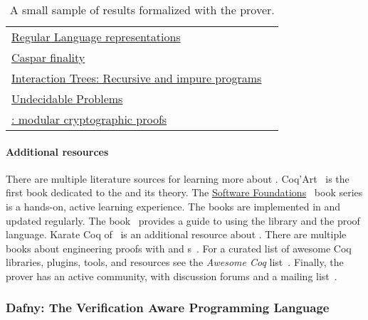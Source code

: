 \begin{table}[p]
\begin{NiceTabularX}{\textwidth}{@{}l@{ }X@{}}
   \href{https://github.com/rocq-community/reglang}%
   {Regular Language representations}
   & \textcite{doczkal2018}
   \\
   \href{https://github.com/runtimeverification/casper-proofs/tree/master}
   {Caspar  finality}
   & \textcite{palmskog2018}
   \\
   \href{https://github.com/DeepSpec/InteractionTrees}%
   {Interaction Trees: Recursive and impure programs}
   & \textcite{xia2019}
   \\
   \href{https://github.com/uds-psl/coq-library-undecidability}%
   {Undecidable Problems}
   & \textcite{forster2020b}
   \\
   \href{https://github.com/SSProve/ssprove}%
   {: modular cryptographic proofs}
   & \textcite{haselwarter2023}
   \\
   \bottomrule
\end{NiceTabularX}
\caption[The Rocq prover formalization results]
{A small sample of results formalized with the  prover.}
\label{tab:rocq-results}
\end{table}

\paragraph*{Additional resources}
There are multiple literature sources for learning more about .
Coq'Art~\cite{bertot2004} is the first book dedicated to the  and its theory. The
\href{https://softwarefoundations.cis.upenn.edu}{Software
Foundations}~\cite{cpierce20221} book series is a hands-on, active learning
experience. The books are implemented in  and updated regularly. The
 book~\cite{mahboubi2022} provides a guide to using
the library and the  proof language. Karate Coq
of~\textcite{affeldt2023} is an additional resource about . There are multiple books about engineering  proofs with
 and s~\cite{chlipala2022,chlipala2013,sergey2014,smolka2021}. For a curated
list of awesome Coq libraries, plugins, tools, and resources see the
\emph{Awesome Coq} list~\cite{awesome-coq}. Finally, the  prover has
an active community, with discussion forums and a mailing
list~\cite{rocq-community}.

\subsubsection{Dafny: The Verification Aware Programming Language}
\label{subsubsec:dafny}

